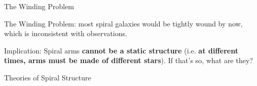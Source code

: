 \documentclass[letterpaper,landscape]{slides}
\begin{document}
\begin{slide}

\begin{center}
{\large \color{red} 
                 The Winding Problem }
\end{center}

\begin{center}
\vskip -0.0in
\end{center}

The Winding Problem: most spiral galaxies would be tightly wound by
now, which is inconsistent with observations.

Implication: Spiral arms {\bf cannot be a static structure} (i.e. {\bf at 
different times, arms must be made of different stars}). If that's so,
what are they?

\vfill
\end{slide}


\begin{slide}
\begin{center}
\vskip 3in
{\large \color{red} Theories of Spiral Structure  }
\end{center}

\end{slide}
\end{document}
